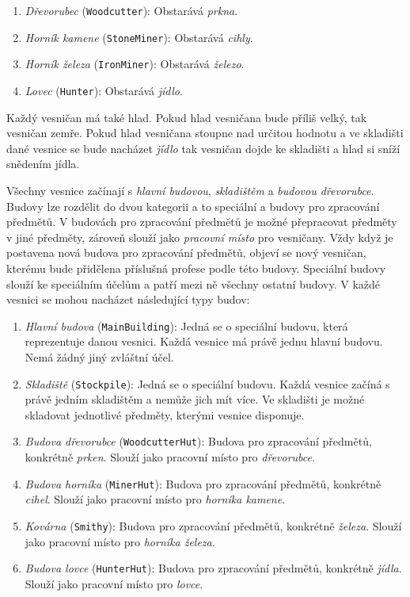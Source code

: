 \begin{enumerate}
    \item \textit{Dřevorubec} (\verb|Woodcutter|): Obstarává \textit{prkna}.
    \item \textit{Horník kamene} (\verb|StoneMiner|): Obstarává \textit{cihly}.
    \item \textit{Horník železa} (\verb|IronMiner|): Obstarává \textit{železo}.
    \item \textit{Lovec} (\verb|Hunter|): Obstarává \textit{jídlo}.
\end{enumerate}

Každý vesničan má také hlad. Pokud hlad vesničana bude příliš velký, tak vesničan zemře. Pokud hlad vesničana stoupne nad určitou hodnotu a ve skladišti dané vesnice se bude nacházet \textit{jídlo} tak vesničan dojde ke skladišti a hlad si sníží snědením jídla.

Všechny vesnice začínají s \textit{hlavní budovou}, \textit{skladištěm} a \textit{budovou dřevorubce}. Budovy lze rozdělit do dvou kategorii a to speciální a budovy pro zpracování předmětů. V budovách pro zpracování předmětů je možné přepracovat předměty v jiné předměty, zároveň slouží jako \textit{pracovní místo} pro vesničany. Vždy když je postavena nová budova pro zpracování předmětů, objeví se nový vesničan, kterému bude přidělena příslušná profese podle této budovy. Speciální budovy slouží ke speciálním účelům a patří mezi ně všechny ostatní budovy. V každé vesnici se mohou nacházet následující typy budov:

\begin{enumerate}
    \item \textit{Hlavní budova} (\verb|MainBuilding|): Jedná se o speciální budovu, která reprezentuje danou vesnici. Každá vesnice má právě jednu hlavní budovu. Nemá žádný jiný zvláštní účel.
    \item \textit{Skladiště} (\verb|Stockpile|): Jedná se o speciální budovu. Každá vesnice začíná s právě jedním skladištěm a nemůže jich mít více. Ve skladišti je možné skladovat jednotlivé předměty, kterými vesnice disponuje.
    \item \textit{Budova dřevorubce} (\verb|WoodcutterHut|): Budova pro zpracování předmětů, konkrétně \textit{prken}. Slouží jako pracovní místo pro \textit{dřevorubce}.
    \item \textit{Budova horníka} (\verb|MinerHut|): Budova pro zpracování předmětů, konkrétně \textit{cihel}. Slouží jako pracovní místo pro \textit{horníka kamene}.
    \item \textit{Kovárna} (\verb|Smithy|): Budova pro zpracování předmětů, konkrétně \textit{železa}. Slouží jako pracovní místo pro \textit{horníka železa}.
    \item \textit{Budova lovce} (\verb|HunterHut|): Budova pro zpracování předmětů, konkrétně \textit{jídla}. Slouží jako pracovní místo pro \textit{lovce}.
\end{enumerate}
